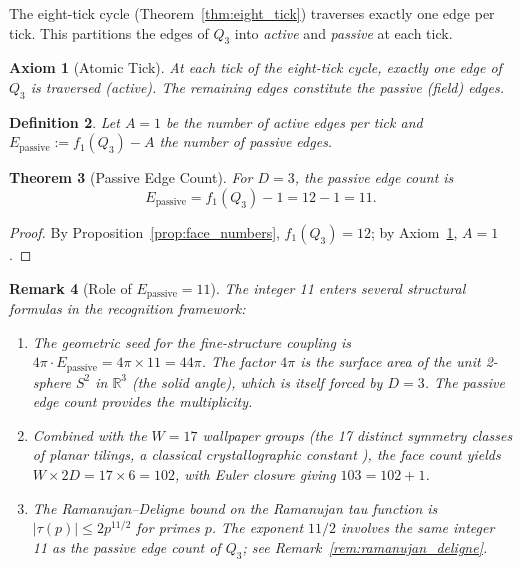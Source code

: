 \documentclass[11pt]{article}
\newtheorem{theorem}{Theorem}[section]
\newtheorem{definition}[theorem]{Definition}
\newtheorem{remark}[theorem]{Remark}
\newtheorem{axiom}[theorem]{Axiom}
\newcommand{\R}{\mathbb{R}}
\begin{document}
The eight-tick cycle (Theorem~\ref{thm:eight_tick}) traverses exactly one edge per tick.
This partitions the edges of $Q_3$ into \emph{active} and \emph{passive} at each tick.

\begin{axiom}[Atomic Tick]\label{ax:atomic_tick}
At each tick of the eight-tick cycle, exactly one edge of $Q_3$ is traversed (active).
The remaining edges constitute the passive (field) edges.
\end{axiom}

\begin{definition}\label{def:active_passive}
Let $A = 1$ be the number of active edges per tick and $E_{\mathrm{passive}} := f_1(Q_3) - A$ the number of passive edges.
\end{definition}

\begin{theorem}[Passive Edge Count]\label{thm:passive}
For $D = 3$, the passive edge count is
\[
E_{\mathrm{passive}} = f_1(Q_3) - 1 = 12 - 1 = 11.
\]
\end{theorem}

\begin{proof}
By Proposition~\ref{prop:face_numbers}, $f_1(Q_3) = 12$; by Axiom~\ref{ax:atomic_tick}, $A = 1$.
\end{proof}

\begin{remark}[Role of $E_{\mathrm{passive}} = 11$]\label{rem:eleven}
The integer 11 enters several structural formulas in the recognition framework:
\begin{enumerate}
  \item The \emph{geometric seed} for the fine-structure coupling is $4\pi \cdot E_{\mathrm{passive}} = 4\pi \times 11 = 44\pi$.
  The factor $4\pi$ is the surface area of the unit 2-sphere $S^2$ in $\R^3$ (the solid angle), which is itself forced by $D = 3$.
  The passive edge count provides the multiplicity.
  \item Combined with the $W = 17$ wallpaper groups (the 17 distinct symmetry classes of planar tilings, a classical crystallographic constant \cite{Fedorov1891, Conway2008}), the face count yields $W \times 2D = 17 \times 6 = 102$, with Euler closure giving $103 = 102 + 1$.
  \item The Ramanujan--Deligne bound on the Ramanujan tau function is $|\tau(p)| \le 2p^{11/2}$ for primes $p$.
  The exponent $11/2$ involves the same integer 11 as the passive edge count of $Q_3$; see Remark~\ref{rem:ramanujan_deligne}.
\end{enumerate}
\end{remark}
\end{document}
